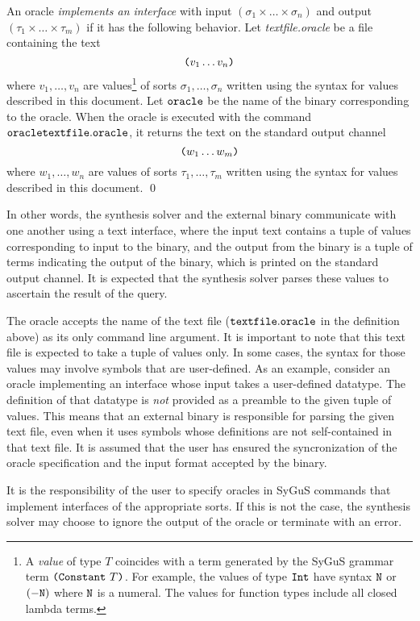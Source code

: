 \documentclass[english,a4paper,10pt]{article}
\begin{document}
\begin{definition}
An oracle \emph{implements an interface} with input
$(\sigma_1 \times \ldots \times \sigma_n)$ and output
$(\tau_1 \times \ldots \times \tau_m)$ if
it has the following behavior.
Let \textit{textfile.oracle}
be a file containing the text
\[
\texttt{(}v_1 \ldots v_n\texttt{)}
\]
where $v_1, \ldots, v_n$ are values\footnote{
A \emph{value} of type $T$ 
coincides with a term generated by the SyGuS grammar term
$\texttt{(}\texttt{Constant}\mbox{ }T\texttt{)}$.
For example, the values of type ${\tt Int}$
have syntax ${\tt N}$ or ${\tt (- N)}$ where ${\tt N}$ is a numeral.
The values for function types include all closed lambda terms.
} of sorts $\sigma_1, \ldots, \sigma_n$
written using the syntax for values described in this document.
Let ${\tt oracle}$ be the name of the binary corresponding to the oracle.
When the oracle is executed with the command
${\tt oracle textfile.oracle}$,
it returns the text on the standard output channel
\[
\texttt{(}w_{1} \ldots w_{m}\texttt{)}
\]
where $w_1, \ldots, w_n$ are values of sorts $\tau_1, \ldots, \tau_m$
written using the syntax for values described in this document.
\qed
\end{definition}

In other words, the synthesis solver and the external binary
communicate with one another using a text interface, where the input text contains
a tuple of values corresponding to input to the binary, and the output
from the binary is a tuple of terms indicating the output of the binary,
which is printed on the standard output channel.
It is expected that the synthesis solver parses these values to
ascertain the result of the query.

The oracle accepts the name of the text file
(${\tt textfile.oracle}$ in the definition above)
as its only command line argument.
It is important to note that this text file is expected to take
a tuple of values only.
In some cases, 
the syntax for those values may involve symbols that are user-defined.
As an example, consider an oracle
implementing an interface whose input takes a user-defined datatype.
The definition of that datatype is \emph{not} provided as a preamble
to the given tuple of values.
This means that an external binary is responsible for
parsing the given text file, even when it uses symbols whose definitions
are not self-contained in that text file. 
It is assumed that
the user has ensured the syncronization of the oracle specification
and the input format accepted by the binary.

It is the responsibility of the user to specify oracles in
SyGuS commands that implement interfaces of the appropriate sorts.
If this is not the case, the synthesis solver may choose to ignore the output
of the oracle or terminate with an error.
\end{document}
